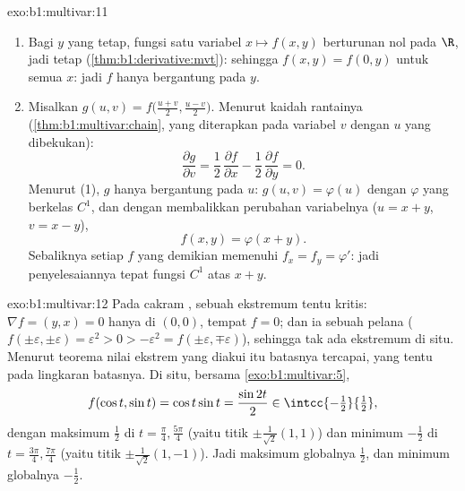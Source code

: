 \begin{solution}{exo:b1:multivar:11}
\begin{enumerate}
  \item Bagi $y$ yang tetap, fungsi satu variabel $x \mapsto
        f(x,y)$ berturunan nol pada $\R$, jadi tetap
        (\cref{thm:b1:derivative:mvt}): sehingga $f(x, y) = f(0, y)$ untuk
        semua $x$: jadi $f$ hanya bergantung pada $y$.
  \item Misalkan $g(u, v) = f\bigl(\frac{u+v}2, \frac{u-v}2\bigr)$.
        Menurut kaidah rantainya (\cref{thm:b1:multivar:chain}, yang diterapkan
        pada variabel $v$ dengan $u$ yang dibekukan):
        \[
        \frac{\partial g}{\partial v}
        = \frac12\,\frac{\partial f}{\partial x}
        - \frac12\,\frac{\partial f}{\partial y} = 0 .
        \]
        Menurut (1), $g$ hanya bergantung pada $u$: $g(u, v) = \varphi(u)$
        dengan $\varphi$ yang berkelas $C^1$, dan dengan membalikkan
        perubahan variabelnya ($u = x + y$, $v = x - y$),
        \[
        f(x, y) = \varphi(x + y).
        \]
        Sebaliknya setiap $f$ yang demikian memenuhi $f_x = f_y =
        \varphi'$: jadi penyelesaiannya tepat fungsi $C^1$
        atas $x + y$.
\end{enumerate}
\end{solution}

\begin{solution}{exo:b1:multivar:12}
Pada cakram , sebuah ekstremum tentu kritis: $\nabla f = (y,
x) = 0$ hanya di $(0,0)$, tempat $f = 0$; dan ia sebuah pelana ($f(\pm
\varepsilon, \pm\varepsilon) = \varepsilon^2 > 0 > -\varepsilon^2
= f(\pm\varepsilon, \mp\varepsilon)$), sehingga tak ada ekstremum di situ. Menurut
teorema nilai ekstrem yang diakui itu batasnya tercapai,
yang tentu pada lingkaran batasnya. Di situ, bersama
\cref{exo:b1:multivar:5},
\[
f(\cos t, \sin t) = \cos t\sin t = \frac{\sin 2t}{2}
\in \intcc{-\tfrac12}{\tfrac12},
\]
dengan maksimum $\frac12$ di $t = \frac\pi4, \frac{5\pi}4$ (yaitu titik
$\pm\frac{1}{\sqrt2}(1,1)$) dan minimum $-\frac12$ di $t =
\frac{3\pi}4, \frac{7\pi}4$ (yaitu titik $\pm\frac{1}{\sqrt2}(1,-1)$).
Jadi maksimum globalnya $\frac12$, dan minimum globalnya $-\frac12$.
\end{solution}

